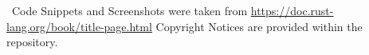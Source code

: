 \documentclass[main.tex,fontsize=8pt,paper=a4,paper=portrait,DIV=calc,]{scrartcl}
\begin{document}
\begin{table}[ht!]
\begin{tabular}{|m{0.2\linewidth}|m{0.755\linewidth}|}
\hline

\hline

\hline

\hline

\hline

\hline

\hline

\hline

\hline

\hline
\end{tabular}
\, \newline
Code Snippets and Screenshots were taken from \href{https://doc.rust-lang.org/book/title-page.html}{https://doc.rust-lang.org/book/title-page.html}\newline
Copyright Notices are provided within the repository.
\end{table}
\end{document}

